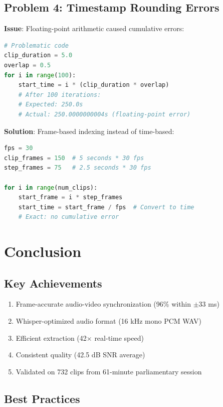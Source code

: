 \documentclass[11pt,a4paper]{article}
\begin{document}
\subsection{Problem 4: Timestamp Rounding Errors}

\textbf{Issue}: Floating-point arithmetic caused cumulative errors:

\begin{lstlisting}[language=Python]
# Problematic code
clip_duration = 5.0
overlap = 0.5
for i in range(100):
    start_time = i * (clip_duration * overlap)
    # After 100 iterations: 
    # Expected: 250.0s
    # Actual: 250.0000000004s (floating-point error)
\end{lstlisting}

\textbf{Solution}: Frame-based indexing instead of time-based:

\begin{lstlisting}[language=Python]
fps = 30
clip_frames = 150  # 5 seconds * 30 fps
step_frames = 75   # 2.5 seconds * 30 fps

for i in range(num_clips):
    start_frame = i * step_frames
    start_time = start_frame / fps  # Convert to time
    # Exact: no cumulative error
\end{lstlisting}

\section{Conclusion}

\subsection{Key Achievements}

\begin{enumerate}
    \item Frame-accurate audio-video synchronization (96\% within $\pm$33 ms)
    \item Whisper-optimized audio format (16 kHz mono PCM WAV)
    \item Efficient extraction (42$\times$ real-time speed)
    \item Consistent quality (42.5 dB SNR average)
    \item Validated on 732 clips from 61-minute parliamentary session
\end{enumerate}

\subsection{Best Practices}
\end{document}
